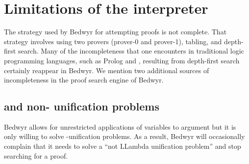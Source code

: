 

\section{Limitations of the interpreter}

The strategy used by Bedwyr for attempting proofs is not complete.  That
strategy involves using two provers (prover-0 and prover-1), tabling, and
depth-first search.  Many of the incompleteness that one encounters in
traditional logic programming languages, such as Prolog and \lp{}, resulting
from depth-first search certainly reappear in Bedwyr.  We mention two
additional sources of incompleteness in the proof search engine of Bedwyr.

\subsection{\texorpdfstring{\Ll{}}{Llambda} and
  non-\texorpdfstring{\Ll{}}{Llambda} unification problems}
Bedwyr allows for unrestricted applications of variables to argument but it is
only willing to solve \Ll{}-unification problems.  As a result, Bedwyr will
occasionally complain that it needs to solve a ``not LLambda unification
problem'' and stop searching for a proof.

